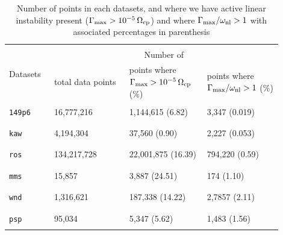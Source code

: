         \begin{table}[ht]
            \centering
            \caption[Dataset detail for $\Gamma_{\max}$ and $\omega_{\rm nl}$]{Number of points in
            each datasets, and where we have active linear instability present ($\Gamma_{\max} >
            10^{-5}\,\Omega_{\rm cp}$) and where $\Gamma_{\max}/\omega_{\rm nl} > 1$ with associated
            percentages in parenthesis}
            \begin{tabular}{  m{0.15\linewidth}  m{0.25\linewidth}  m{0.25\linewidth}
            m{0.25\linewidth}}
                \hline
                \\
                \multirow{2}{\linewidth}{Datasets} & \multicolumn{3}{|c|}{Number of } \\
                \cline{2-4}
                & total data points & points where \newline $\Gamma_{\max} > 10^{-5}\,\Omega_{\rm
                cp}$ (\%) & points where \newline $\Gamma_{\max}/\omega_{\rm nl} > 1$ (\%)\\
                \hline
                \\
                \texttt{149p6} & 16,777,216 & 1,144,615 (6.82) & 3,347 (0.019)\\ \\
                \hline
                \\
                \texttt{kaw} & 4,194,304 & 37,560 (0.90) & 2,227 (0.053) \\ \\
                \hline
                \\
                \texttt{ros} & 134,217,728 & 22,001,875 (16.39) & 794,220 (0.59) \\ \\
                \hline
                \\
                \texttt{mms} & 15,857 & 3,887 (24.51) & 174 (1.10)\\ \\
                \hline
                \\
                \texttt{wnd} & 1,316,621 & 187,338 (14.22) & 2,7857 (2.11) \\ \\
                \hline
                \\
                \texttt{psp} & 95,034 & 5,347 (5.62) & 1,483 (1.56) \\ \\
                \hline
            \end{tabular}
            \label{tab:ngamma}
        \end{table}

